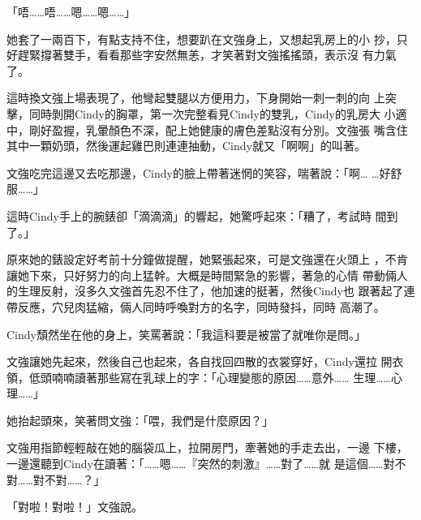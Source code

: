 「唔……唔……嗯……嗯……」

她套了一兩百下，有點支持不住，想要趴在文強身上，又想起乳房上的小
抄，只好趕緊撐著雙手，看看那些字安然無恙，才笑著對文強搖搖頭，表示沒
有力氣了。

這時換文強上場表現了，他彎起雙腿以方便用力，下身開始一刺一刺的向
上突擊，同時剝開Cindy的胸罩，第一次完整看見Cindy的雙乳，Cindy的乳房大
小適中，剛好盈握，乳暈顏色不深，配上她健康的膚色差點沒有分別。文強張
嘴含住其中一顆奶頭，然後運起雞巴則連連抽動，Cindy就又「啊啊」的叫著。

文強吃完這邊又去吃那邊，Cindy的臉上帶著迷惘的笑容，喘著說：「啊…
…好舒服……」

這時Cindy手上的腕錶卻「滴滴滴」的響起，她驚呼起來：「糟了，考試時
間到了。」

原來她的錶設定好考前十分鐘做提醒，她緊張起來，可是文強還在火頭上
，不肯讓她下來，只好努力的向上猛幹。大概是時間緊急的影響，著急的心情
帶動倆人的生理反射，沒多久文強首先忍不住了，他加速的挺著，然後Cindy也
跟著起了連帶反應，穴兒肉猛縮，倆人同時呼喚對方的名字，同時發抖，同時
高潮了。

Cindy頹然坐在他的身上，笑罵著說：「我這科要是被當了就唯你是問。」

文強讓她先起來，然後自己也起來，各自找回四散的衣裳穿好，Cindy還拉
開衣領，低頭喃喃讀著那些寫在乳球上的字：「心理變態的原因……意外……
生理……心理……」

她抬起頭來，笑著問文強：「喂，我們是什麼原因？」

文強用指節輕輕敲在她的腦袋瓜上，拉開房門，牽著她的手走去出，一邊
下樓，一邊還聽到Cindy在讀著：「……嗯……『突然的刺激』……對了……就
是這個……對不對……對不對……？」

「對啦！對啦！」文強說。










